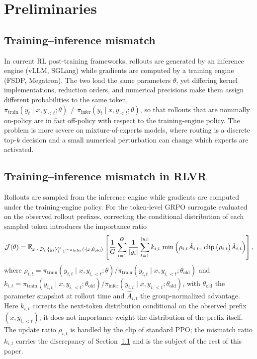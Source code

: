 \section{Preliminaries}
\label{sec:prelim}

\subsection{Training--inference mismatch}
\label{sec:prelim_mismatch}

In current RL post-training frameworks, rollouts are generated by an inference
engine (vLLM, SGLang) while gradients are computed by a training engine (FSDP,
Megatron). The two load the same parameters $\theta$, yet differing kernel
implementations, reduction orders, and numerical precisions make them assign
different probabilities to the same token,
$\pi_{\mathrm{train}}(y_t\mid x,y_{<t};\theta)\ne
\pi_{\mathrm{infer}}(y_t\mid x,y_{<t};\theta)$,
so that rollouts that are nominally on-policy are in fact off-policy with
respect to the training-engine policy. The problem is more severe on
mixture-of-experts models, where routing is a discrete top-$k$ decision and a
small numerical perturbation can change which experts are activated.

\subsection{Training--inference mismatch in RLVR}
\label{sec:prelim_rlvr}

Rollouts are sampled from the inference engine while gradients are computed
under the training-engine policy. For the token-level GRPO surrogate evaluated
on the observed rollout prefixes, correcting the conditional distribution of
each sampled token introduces the importance ratio
\begin{equation}
\mathcal J(\theta)
=
\mathbb{E}_{x\sim\mathcal D,\;\{y_i\}_{i=1}^{G}\sim\pi_{\mathrm{infer}}(\cdot\mid x;\theta_{\mathrm{old}})}
\left[
\frac{1}{G}\sum_{i=1}^{G}\frac{1}{\left\lvert y_i \right\rvert}\sum_{t=1}^{\left\lvert y_i \right\rvert}
k_{i,t}\,
\min\Big(
\rho_{i,t}\hat A_{i,t},\;
\operatorname{clip}\big(\rho_{i,t}\big)\hat A_{i,t}
\Big)
\right],
\label{eq:objective}
\end{equation}
where
$\rho_{i,t}=\pi_{\mathrm{train}}(y_{i,t}\mid x,y_{i,<t};\theta)\big/
\pi_{\mathrm{train}}(y_{i,t}\mid x,y_{i,<t};\theta_{\mathrm{old}})$
and
$k_{i,t}=\pi_{\mathrm{train}}(y_{i,t}\mid x,y_{i,<t};\theta_{\mathrm{old}})\big/
\pi_{\mathrm{infer}}(y_{i,t}\mid x,y_{i,<t};\theta_{\mathrm{old}})$,
with $\theta_{\mathrm{old}}$ the parameter snapshot at rollout time and
$\hat A_{i,t}$ the group-normalized advantage.
Here $k_{i,t}$ corrects the next-token distribution conditional on the observed
prefix $(x,y_{i,<t})$; it does not importance-weight the distribution of the
prefix itself. The update ratio $\rho_{i,t}$ is handled by the clip of standard
PPO; the mismatch ratio $k_{i,t}$ carries the discrepancy of
Section~\ref{sec:prelim_mismatch} and is the subject of the rest of this paper.